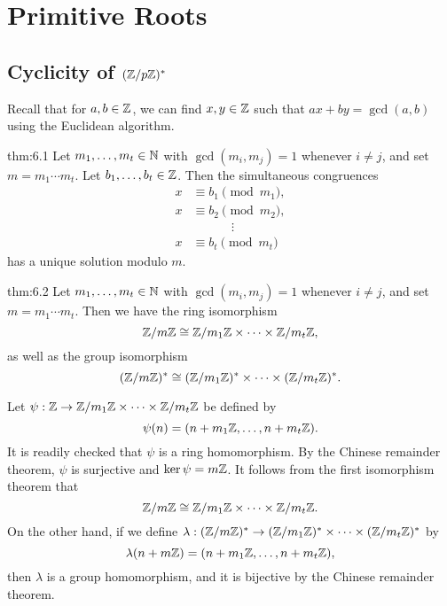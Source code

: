 \section{Primitive Roots}\label{sec:6}

\subsection{Cyclicity of $(\mathbb{Z}/p\mathbb{Z})^*$}\label{subsec:6.1}
Recall that for $a, b \in \mathbb{Z}$, we can find $x, y \in \mathbb{Z}$ such that $ax + by = 
\gcd(a, b)$ using the Euclidean algorithm. 

\begin{theo}{thm:6.1}
    Let $m_1, \dots, m_t \in \mathbb{N}$ with $\gcd(m_i, m_j) = 1$ whenever $i \neq j$, 
    and set $m = m_1 \cdots m_t$. Let $b_1, \dots, b_t \in \mathbb{Z}$. Then the simultaneous 
    congruences 
    \begin{align*}
        x &\equiv b_1 \pmod{m_1}, \\ 
        x &\equiv b_2 \pmod{m_2}, \\ 
          &\qquad\quad\, \vdots \\ 
        x &\equiv b_t \pmod{m_t}
    \end{align*}
    has a unique solution modulo $m$. 
\end{theo}

\begin{theo}{thm:6.2}
    Let $m_1, \dots, m_t \in \mathbb{N}$ with $\gcd(m_i, m_j) = 1$ whenever $i \neq j$, 
    and set $m = m_1 \cdots m_t$. Then we have the ring isomorphism 
    \[ \mathbb{Z}/m\mathbb{Z} \cong \mathbb{Z}/m_1\mathbb{Z} \times \cdots \times \mathbb{Z}/m_t\mathbb{Z}, \] 
    as well as the group isomorphism
    \[ (\mathbb{Z}/m\mathbb{Z})^* \cong (\mathbb{Z}/m_1\mathbb{Z})^* \times \cdots \times (\mathbb{Z}/m_t\mathbb{Z})^*. \] 
\end{theo}
\begin{pf}
    Let $\psi : \mathbb{Z} \to \mathbb{Z}/m_1\mathbb{Z} \times \cdots \times \mathbb{Z}/m_t\mathbb{Z}$ be defined by 
    \[ \psi(n) = (n+m_1\mathbb{Z}, \dots, n+m_t\mathbb{Z}). \] 
    It is readily checked that $\psi$ is a ring homomorphism. By the Chinese 
    remainder theorem, $\psi$ is surjective and $\ker\psi = m\mathbb{Z}$. It follows 
    from the first isomorphism theorem that 
    \[ \mathbb{Z}/m\mathbb{Z} \cong \mathbb{Z}/m_1\mathbb{Z} \times \cdots \times \mathbb{Z}/m_t\mathbb{Z}. \] 
    On the other hand, if we define $\lambda : (\mathbb{Z}/m\mathbb{Z})^* \to
    (\mathbb{Z}/m_1\mathbb{Z})^* \times \cdots \times (\mathbb{Z}/m_t\mathbb{Z})^*$ by 
    \[ \lambda(n + m\mathbb{Z}) = (n+m_1\mathbb{Z}, \dots, n+m_t\mathbb{Z}), \] 
    then $\lambda$ is a group homomorphism, and it is bijective by the Chinese 
    remainder theorem. 
\end{pf}

